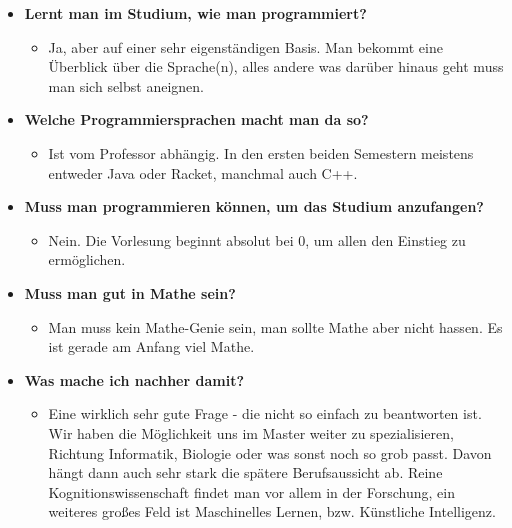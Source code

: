 \begin{large}
\begin{itemize}
	\item \textbf{Lernt man im Studium, wie man programmiert?}
	\begin{itemize}
		\item Ja, aber auf einer sehr eigenständigen Basis. Man bekommt eine Überblick über die Sprache(n), alles andere was darüber hinaus geht muss man sich selbst aneignen.
	\end{itemize}
\end{itemize}
	
\begin{itemize}
	\item \textbf{Welche Programmiersprachen macht man da so?}
	\begin{itemize}
		\item Ist vom Professor abhängig. In den ersten beiden Semestern meistens entweder Java oder Racket, manchmal auch C++.
	\end{itemize}
\end{itemize}

\begin{itemize}
	\item \textbf{Muss man programmieren können, um das Studium anzufangen?}
	\begin{itemize}
		\item Nein. Die Vorlesung beginnt absolut bei 0, um allen den Einstieg zu ermöglichen.
	\end{itemize}
\end{itemize}

\begin{itemize}
	\item \textbf{Muss man gut in Mathe sein?}
	\begin{itemize}
		\item Man muss kein Mathe-Genie sein, man sollte Mathe aber nicht hassen. Es ist gerade am Anfang viel Mathe.
	\end{itemize}
\end{itemize}

\begin{itemize}
	\item \textbf{Was mache ich nachher damit?}
	\begin{itemize}
		\item Eine wirklich sehr gute Frage - die nicht so einfach zu beantworten ist. Wir haben die Möglichkeit uns im Master weiter zu spezialisieren, Richtung Informatik, Biologie oder was sonst noch so grob passt. Davon hängt dann auch sehr stark die spätere Berufsaussicht ab. Reine Kognitionswissenschaft findet man vor allem in der Forschung, ein weiteres großes Feld ist Maschinelles Lernen, bzw. Künstliche Intelligenz.
	\end{itemize}
\end{itemize}


\end{large}
